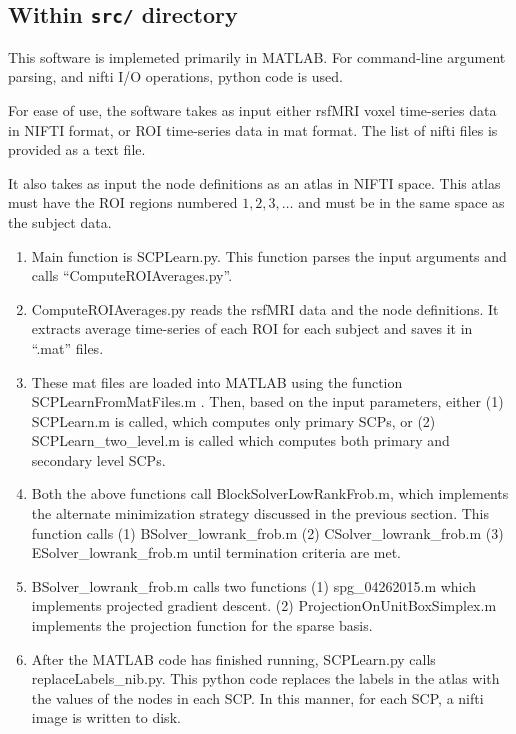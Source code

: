 \documentclass[12pt]{article}
\begin{document}
\subsection{Within \texttt{src/} directory}
This software is implemeted primarily in MATLAB. For command-line argument parsing, and nifti I/O operations, python code is used.

For ease of use, the software takes as input either rsfMRI voxel time-series data in NIFTI format, or ROI time-series data in mat format. The list of nifti files is provided as a text file. 

It also takes as input the node definitions as an atlas in NIFTI space. This atlas must have the ROI regions numbered $1, 2, 3, \ldots$ and must be in the same space as the subject data. 

\begin{enumerate}
\item Main function is {\color{blue}SCPLearn.py}. This function parses the input arguments and calls ``ComputeROIAverages.py''.
\item {\color{blue}ComputeROIAverages.py} reads the rsfMRI data and the node definitions. It extracts average time-series of each ROI for each subject and saves it in ``.mat'' files.
\item These mat files are loaded into MATLAB using the function {\color{magenta}SCPLearnFromMatFiles.m} . Then, based on the input parameters, either (1) {\color{magenta}SCPLearn.m} is called, which computes only primary SCPs,  or (2) {\color{magenta}SCPLearn\_two\_level.m} is called which computes both primary and secondary level SCPs.
\item Both the above functions call {\color{magenta}BlockSolverLowRankFrob.m}, which implements the alternate minimization strategy discussed in the previous section. This function calls (1) {\color{magenta}BSolver\_lowrank\_frob.m} (2)  {\color{magenta}CSolver\_lowrank\_frob.m}  (3)  {\color{magenta}ESolver\_lowrank\_frob.m} until termination criteria are met.
\item {\color{magenta}BSolver\_lowrank\_frob.m} calls two functions (1) {\color{magenta}spg\_04262015.m} which implements projected gradient descent. (2) {\color{magenta}ProjectionOnUnitBoxSimplex.m} implements the projection function for the sparse basis.
\item After the MATLAB code has finished running, {\color{blue}SCPLearn.py} calls {\color{blue}replaceLabels\_nib.py}. This python code replaces the labels in the atlas with the values of the nodes in each SCP. In this manner, for each SCP, a nifti image is written to disk.

\end{enumerate}
\end{document}
